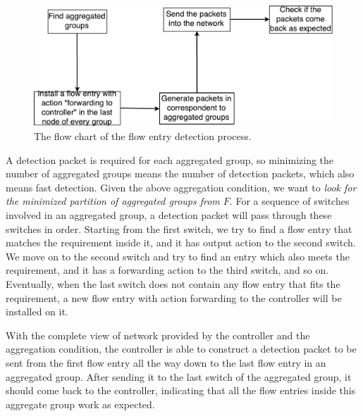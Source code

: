 \begin{figure}[H]
\begin{center} 
\includegraphics[width=1\textwidth]{figures/flow_entry_detection_flowchart.pdf}
\end{center}
\caption{The flow chart of the flow entry detection process.}
\label{flow_entry_detection_flowchart}
\end{figure}


A detection packet is required for each aggregated group, so minimizing the number of aggregated groups means the number of detection packets, which also means fast detection. Given the above aggregation condition, we want to \textit{look for the minimized partition of aggregated groups from $F$}. For a sequence of switches involved in an aggregated group, a detection packet will pass through these switches in order. Starting from the first switch, we try to find a flow entry that matches the requirement inside it, and it has output action to the second switch. We move on to the second switch and try to find an entry which also meets the requirement, and it has a forwarding action to the third switch, and so on. Eventually, when the last switch does not contain any flow entry that fits the requirement, a new flow entry with action forwarding to the controller will be installed on it.

With the complete view of network provided by the controller and the aggregation condition, the controller is able to construct a detection packet to be sent from the first flow entry all the way down to the last flow entry in an aggregated group. After sending it to the last switch of the aggregated group, it should come back to the controller, indicating that all the flow entries inside this aggregate group work as expected. 


